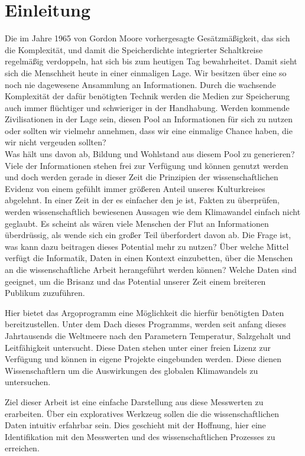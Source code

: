 
\section{Einleitung}

    
    Die im Jahre 1965 von Gordon Moore vorhergesagte Gesätzmäßigkeit, das sich die Komplexität, und damit die Speicherdichte integrierter Schaltkreise regelmäßig verdoppeln,  hat sich bis zum heutigen Tag bewahrheitet. Damit sieht sich die Menschheit heute in einer einmaligen Lage. Wir besitzen über eine so noch nie dagewesene Ansammlung an Informationen. Durch die wachsende Komplexität der dafür benötigten Technik werden die Medien zur Speicherung auch immer flüchtiger und schwieriger in der Handhabung. Werden kommende Zivilisationen in der Lage sein, diesen Pool an Informationen für sich zu nutzen oder sollten wir vielmehr annehmen, dass wir eine einmalige Chance haben, die wir nicht vergeuden sollten? \\
    
    Was hält uns davon ab, Bildung und Wohlstand aus diesem Pool zu generieren? Viele der Informationen stehen frei zur Verfügung und können genutzt werden und doch werden gerade in dieser Zeit die Prinzipien der wissenschaftlichen Evidenz von einem gefühlt immer größeren Anteil unseres Kulturkreises abgelehnt. 
    In einer Zeit in der es einfacher den je ist, Fakten zu überprüfen, werden wissenschaftlich bewiesenen Aussagen wie dem Klimawandel einfach nicht geglaubt.
    Es scheint als wären viele Menschen der Flut an Informationen überdrüssig, als wende sich ein großer Teil überfordert davon ab.
    Die Frage ist, was kann dazu beitragen dieses Potential mehr zu nutzen? 
    Über welche Mittel verfügt die Informatik, Daten in einen Kontext einzubetten, über die Menschen an  die wissenschaftliche Arbeit herangeführt werden können? Welche Daten sind geeignet, um die Brisanz und das Potential unserer Zeit einem breiteren Publikum zuzuführen.
    
    Hier bietet das Argoprogramm eine Möglichkeit die hierfür benötigten Daten bereitzustellen. Unter dem Dach dieses Programms, werden seit anfang dieses Jahrtausends die Weltmeere nach den Parametern Temperatur, Salzgehalt und Leitfähigkeit untersucht. Diese Daten stehen unter einer freien Lizenz zur Verfügung und können in eigene Projekte eingebunden werden.  Diese dienen Wissenschaftlern um die Auswirkungen des globalen Klimawandels zu untersuchen.
   
    Ziel dieser Arbeit ist eine einfache Darstellung aus diese Messwerten zu erarbeiten. Über ein exploratives Werkzeug sollen die  die wissenschaftlichen Daten intuitiv erfahrbar sein. Dies geschieht mit der Hoffnung, hier eine Identifikation mit den Messwerten und des wissenschaftlichen Prozesses zu erreichen. 
   
